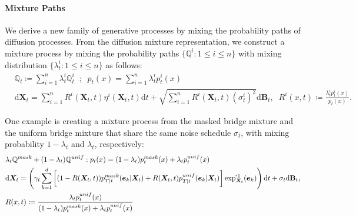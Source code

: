 \paragraph{Mixture Paths} \label{app:derivation:mixture_path}
We derive a new family of generative processes by mixing the probability paths of diffusion processes.
From the diffusion mixture representation, we construct a mixture process by mixing the probability paths $\{\mathbb{Q}^i:1\leq i\leq n\}$ with mixing distribution $\{\lambda^i_t:1\leq i\leq n\}$ as follows:
\begin{align}
    &\mathbb{Q}_t \coloneqq \sum^n_{i=1} \lambda^{i}_t \mathbb{Q}^i_t \;\;; \;\; p_t(x) = \sum^n_{i=1} \lambda^i_t p^i_t(x) \\
    & \mathrm{d}\bm{X}_t = \sum^n_{i=1}  
        R^{i}(\bm{X}_t,t) \eta^{i}(\bm{X}_t,t)
    \mathrm{d}t + 
        \sqrt{\sum^n_{i=1} R^{i}(\bm{X}_t,t) (\sigma^i_t)^2 }
    \mathrm{d}\mathbf{B}_t, \;\; 
    R^{i}(x,t) \coloneqq \frac{\lambda^i_t p^i_t(x)}{p_t(x)} .
\end{align}

One example is creating a mixture process from the masked bridge mixture and the uniform bridge mixture that share the same noise schedule $\sigma_t$, with mixing probability $1-\lambda_t$ and $\lambda_t$, respectively:
\begin{align}
    &\lambda_t\mathbb{Q}^{mask} + (1-\lambda_t)\mathbb{Q}^{unif}: 
    p_t(x) = (1 - \lambda_t) p^{mask}_t(x) + \lambda_t p^{unif}_t(x) \\
    &\mathrm{d}\bm{X}_t = \left(
        \gamma_t \sum^{d}_{k=1} \bigg[ 
            (1-R(\bm{X}_t, t)) p^{mask}_{T|t}(\bm{e}_k|\bm{X}_t) + R(\bm{X}_t, t) p^{unif}_{T|t}(\bm{e}_k|\bm{X}_t)
        \bigg] \logmap{\bm{X}_t}{\bm{e}_k}
    \right) \mathrm{d}t + 
    \sigma_t\mathrm{d}\mathbf{B}_t, \\
    & R(x, t) \coloneqq \frac{\lambda_t p^{unif}_t(x)}{(1-\lambda_t) p^{mask}_t(x) + \lambda_t p^{unif}_t(x)}
\end{align}





